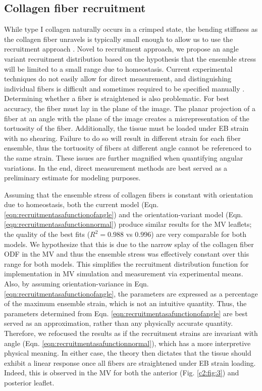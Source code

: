     
    
    
\subsection{Collagen fiber recruitment}

    While type I collagen naturally occurs in a crimped state, the bending stiffness as the collagen fiber unravels is typically small enough to allow us to use the recruitment approach \cite{lanir_constitutive_1983}\cite{fata_insights_2014}\cite{sacks_incorporation_2003}\cite{lanir_structural_1979}\cite{kastelic_structural_1980}\cite{hansen_recruitment_2002}\cite{cacho_constitutive_2007}\cite{grytz_constitutive_2009}. Novel to recruitment approach, we propose an angle variant recruitment distribution based on the hypothesis that the ensemble stress will be limited to a small range due to homeostasis. Current experimental techniques do not easily allow for direct measurement, and distinguishing individual fibers is difficult and sometimes required to be specified manually \cite{hill_theoretical_2012}. Determining whether a fiber is straightened is also problematic. For best accuracy, the fiber must lay in the plane of the image. The planar projection of a fiber at an angle with the plane of the image creates a misrepresentation of the tortuosity of the fiber. Additionally, the tissue must be loaded under EB strain with no shearing. Failure to do so will result in different strain for each fiber ensemble, thus the tortuosity of fibers at different angle cannot be referenced to the same strain. These issues are further magnified when quantifying angular variations. In the end, direct measurement methods are best served as a preliminary estimate for modeling purposes.


    Assuming that the ensemble stress of collagen fibers is constant with orientation due to homeostasis, both the current model (Eqn. \ref{eqn:recruitmentasafunctionofangle}) and the orientation-variant model (Eqn. \ref{eqn:recruitmentasafunctionnormal}) produce similar results for the MV leaflets; the quality of the best fits ($R^2 = 0.988$ vs $0.996$) are very comparable for both models. We hypothesize that this is due to the narrow splay of the collagen fiber ODF in the MV and thus the ensemble stress was effectively constant over this range for both models. This simplifies the recruitment distribution function for implementation in MV simulation and measurement via experimental means. Also, by assuming orientation-variance in Eqn. \ref{eqn:recruitmentasafunctionofangle}, the parameters are expressed as a percentage of the maximum ensemble strain, which is not an intuitive quantity. Thus, the parameters determined from Eqn. \ref{eqn:recruitmentasafunctionofangle} are best served as an approximation, rather than any physically accurate quantity. Therefore, we refocused the results as if the recruitment strains are invariant with angle (Eqn. \ref{eqn:recruitmentasafunctionnormal}), which has a more interpretive physical meaning. In either case, the theory then dictates that the tissue should exhibit a linear response once all fibers are straightened under EB strain loading. Indeed, this is observed in the MV for both the anterior (Fig. \ref{c2:fig:3}) and posterior leaflet.


